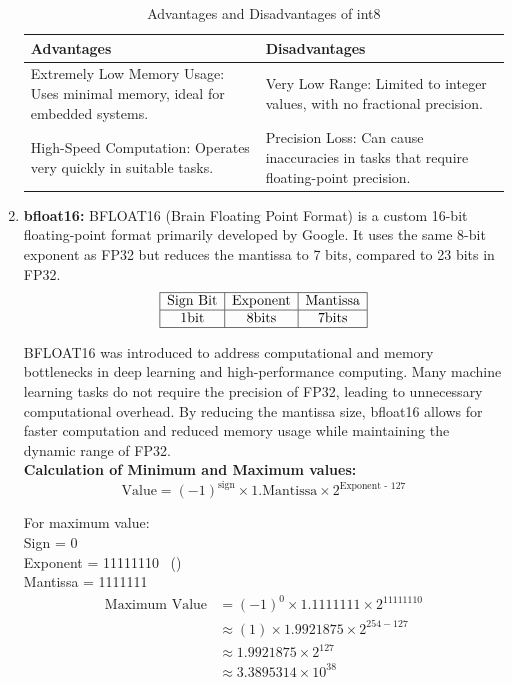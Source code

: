 \begin{enumerate}[label=\textbf{\roman*.}]
 
    \begin{table}[H]
        \centering
        \caption{Advantages and Disadvantages of int8}
        \label{tab:int8}
        \begin{tabular}{|p{6cm}|p{6cm}|}
        \hline
        \textbf{Advantages} & \textbf{Disadvantages} \\
        \hline
        Extremely Low Memory Usage: Uses minimal memory, ideal for embedded systems. & Very Low Range: Limited to integer values, with no fractional precision. \\
        \hline
        High-Speed Computation: Operates very quickly in suitable tasks. & Precision Loss: Can cause inaccuracies in tasks that require floating-point precision. \\
        \hline
        \end{tabular}
    \end{table}

    \item \textbf{bfloat16:}
    BFLOAT16 (Brain Floating Point Format) is a custom 16-bit floating-point format primarily developed by Google. It uses the same 8-bit exponent as FP32 but reduces the mantissa to 7 bits, compared to 23 bits in FP32.
    \[
    \begin{array}{|c|c|c|}
        \hline
        \text{Sign Bit} & \text{Exponent} & \text{Mantissa} \\
        \hline
        1 \text{bit} & 8 \text{bits} & 7 \text{bits} \\
        \hline
    \end{array}
    \]
    
    BFLOAT16 was introduced to address computational and memory bottlenecks in deep learning and high-performance computing. Many machine learning tasks do not require the precision of FP32, leading to unnecessary computational overhead. By reducing the mantissa size, bfloat16 allows for faster computation and reduced memory usage while maintaining the dynamic range of FP32. \\
    \textbf{Calculation of Minimum and Maximum values:} 
    \[
    \text{Value} = (-1)^{\text{sign}} \times 1.\text{Mantissa} \times 2^{\text{Exponent - 127}}
    \]

    For maximum value:\\
    Sign = 0 \\
    Exponent = 11111110 \ () \\
    Mantissa = 1111111
    \[
        \begin{aligned}
            \text{Maximum Value} &= (-1)^{0} \times 1.1111111 \times 2^{11111110} \\
            & \approx (1) \times 1.9921875 \times 2^{254 - 127} \\
            & \approx 1.9921875 \times 2^{127} \\
            & \approx 3.3895314 \times 10^{38}
        \end{aligned}
    \]


\end{enumerate}
